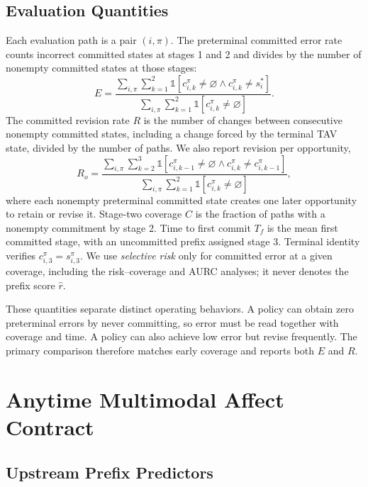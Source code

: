 \documentclass[journal]{IEEEtran}
\begin{document}
\subsection{Evaluation Quantities}

Each evaluation path is a pair $(i,\pi)$. The preterminal committed error rate counts incorrect committed states at stages 1 and 2 and divides by the number of nonempty committed states at those stages:
\begin{equation}
E=\frac{\sum_{i,\pi}\sum_{k=1}^{2}\mathbb{1}[c_{i,k}^{\pi}\neq\varnothing \land c_{i,k}^{\pi}\neq s_i^*]}
{\sum_{i,\pi}\sum_{k=1}^{2}\mathbb{1}[c_{i,k}^{\pi}\neq\varnothing]}.
\end{equation}
The committed revision rate $R$ is the number of changes between consecutive nonempty committed states, including a change forced by the terminal TAV state, divided by the number of paths. We also report revision per opportunity,
\begin{equation}
R_o=\frac{\sum_{i,\pi}\sum_{k=2}^{3}\mathbb{1}[c_{i,k-1}^{\pi}\neq\varnothing \land c_{i,k}^{\pi}\neq c_{i,k-1}^{\pi}]}{\sum_{i,\pi}\sum_{k=1}^{2}\mathbb{1}[c_{i,k}^{\pi}\neq\varnothing]},
\end{equation}
where each nonempty preterminal committed state creates one later opportunity to retain or revise it. Stage-two coverage $C$ is the fraction of paths with a nonempty commitment by stage 2. Time to first commit $T_f$ is the mean first committed stage, with an uncommitted prefix assigned stage 3. Terminal identity verifies $c_{i,3}^{\pi}=s_{i,3}^{\pi}$. We use \emph{selective risk} only for committed error at a given coverage, including the risk--coverage and AURC analyses; it never denotes the prefix score $\hat r$.

These quantities separate distinct operating behaviors. A policy can obtain zero preterminal errors by never committing, so error must be read together with coverage and time. A policy can also achieve low error but revise frequently. The primary comparison therefore matches early coverage and reports both $E$ and $R$.

\section{Anytime Multimodal Affect Contract}

\subsection{Upstream Prefix Predictors}
\end{document}
